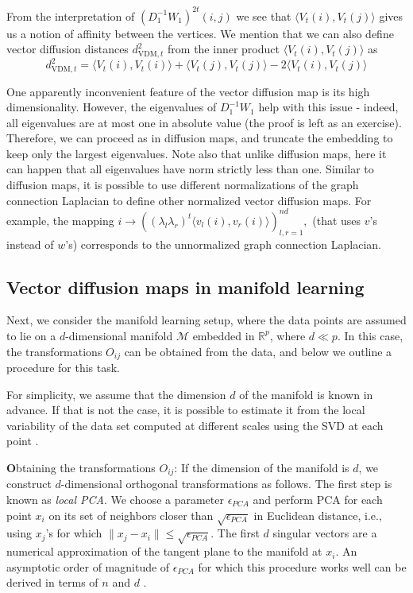 From the interpretation of $\left( D_1^{-1}W_1\right)^{2t}(i,j)$ we see that $\langle V_t(i), V_t(j) \rangle$ gives us a notion of affinity between the vertices. We mention that we can also define vector diffusion distances $d_{\text{VDM},t}^2$ from the inner product $\langle V_t(i), V_t(j) \rangle$ as
$$d_{\text{VDM},t}^2 = \langle V_t(i), V_t(i) \rangle + \langle V_t(j), V_t(j) \rangle - 2 \langle V_t(i), V_t(j) \rangle$$

One apparently inconvenient feature of the vector diffusion map is its high dimensionality. However, the eigenvalues of $D_1^{-1}W_1$ help with this issue - indeed, all eigenvalues are at most one in absolute value (the proof is left as an exercise). Therefore, we can proceed as in diffusion maps, and truncate the embedding to keep only the largest eigenvalues. Note also that unlike diffusion maps, here it can happen that all eigenvalues have norm strictly less than one. Similar to diffusion maps, it is possible to use different normalizations of the graph connection Laplacian to define other normalized vector diffusion maps. For example, the mapping $i \to \left((\lambda_l\lambda_r)^t\langle v_l(i), v_r(i) \rangle \right)_{l,r=1}^{nd},$ (that uses $v$'s instead of $w$'s) corresponds to the unnormalized graph connection Laplacian. 

\subsection{Vector diffusion maps in manifold learning}

Next, we consider the manifold learning setup, where the data points are assumed to lie on a $d$-dimensional manifold $\mathcal{M}$ embedded in $\mathbb{R}^p$, where $d \ll p$. In this case, the transformations $O_{ij}$ can be obtained from the data, and below we outline a procedure for this task.

For simplicity, we assume that the dimension $d$ of the manifold is known in advance. If that is not the case, it is possible to estimate it from the local variability of the data set computed at different scales using the SVD at each point \cite{AVLittle_YMJung_MMaggioni_2009_ManDim}. 

\medskip
\noindent
{\textbf Obtaining the transformations $O_{ij}$:}
If the dimension of the manifold is $d$, we construct $d$-dimensional orthogonal transformations as follows. The first step is known as \emph{local PCA}. We choose a parameter $\epsilon_{PCA}$ and perform PCA for each point $x_i$ on its set of neighbors closer than $\sqrt{\epsilon_{PCA}}$ in Euclidean distance, i.e., using $x_j$'s for which $\|x_j - x_i\| \leq \sqrt{\epsilon_{PCA}}$. The first $d$ singular vectors are a numerical approximation of the tangent plane to the manifold at $x_i$. An asymptotic order of magnitude of $\epsilon_{PCA}$ for which this procedure works well can be derived in terms of $n$ and $d$ \cite{ASinger_HTWu_2011_VDM}. 

